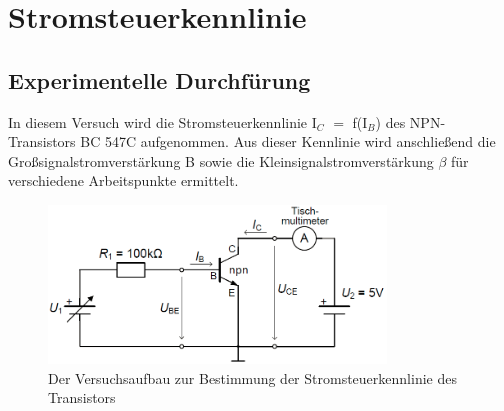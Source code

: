 \section{Stromsteuerkennlinie}
\subsection{Experimentelle Durchf\"urung}
In diesem Versuch wird die Stromsteuerkennlinie I$_C$ $=$ f(I$_B$) des NPN-Transistors BC 547C aufgenommen. Aus dieser Kennlinie wird anschlie\ss end die Gro\ss signalstromverst\"arkung B sowie die Kleinsignalstromverst\"arkung $\beta$ f\"ur verschiedene Arbeitspunkte ermittelt.
\begin{figure}[!h]
\begin{center}
\includegraphics[width=0.8\textwidth]{stromSteuerKennlinie}
\caption{Der Versuchsaufbau zur Bestimmung der Stromsteuerkennlinie des Transistors}
\end{center}
\end{figure}
\newpage
